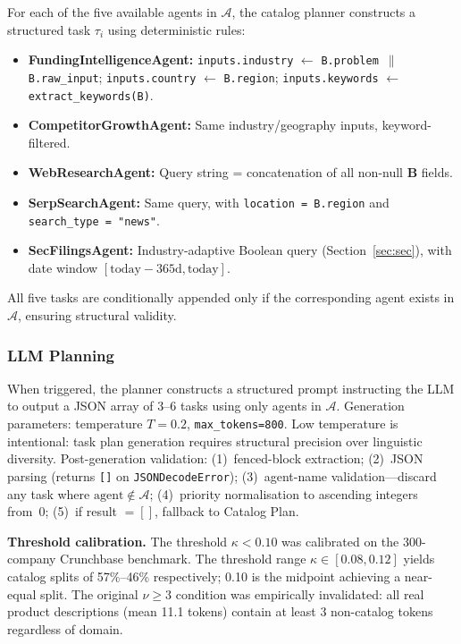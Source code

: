 \documentclass[preprint,12pt]{elsarticle}
\newcommand{\B}{\mathbf{B}}
\newcommand{\calA}{\mathcal{A}}
\begin{document}
For each of the five available agents in $\calA$, the catalog planner constructs
a structured task $\tau_i$ using deterministic rules:
\begin{itemize}
  \item \textbf{FundingIntelligenceAgent:} \texttt{inputs.industry}
        $\leftarrow$ \texttt{B.problem $\|$ B.raw\_input};
        \texttt{inputs.country} $\leftarrow$ \texttt{B.region};
        \texttt{inputs.keywords} $\leftarrow$ \texttt{extract\_keywords(B)}.
  \item \textbf{CompetitorGrowthAgent:} Same industry/geography inputs,
        keyword-filtered.
  \item \textbf{WebResearchAgent:} Query string = concatenation of all non-null
        $\B$ fields.
  \item \textbf{SerpSearchAgent:} Same query, with \texttt{location = B.region}
        and \texttt{search\_type = "news"}.
  \item \textbf{SecFilingsAgent:} Industry-adaptive Boolean query
        (Section~\ref{sec:sec}), with date window $[\text{today} - 365\text{d},
        \text{today}]$.
\end{itemize}
All five tasks are conditionally appended only if the corresponding agent exists
in $\calA$, ensuring structural validity.

\subsubsection{LLM Planning}

When triggered, the planner constructs a structured prompt instructing the LLM to
output a JSON array of 3--6 tasks using only agents in $\calA$.
Generation parameters: temperature $T{=}0.2$, \texttt{max\_tokens=800}. Low
temperature is intentional: task plan generation requires structural precision
over linguistic diversity. Post-generation validation: (1)~fenced-block
extraction; (2)~JSON parsing (returns \texttt{[]} on \texttt{JSONDecodeError});
(3)~agent-name validation---discard any task where
$\text{agent} \notin \calA$; (4)~priority normalisation to ascending integers
from~0; (5)~if result $= []$, fallback to Catalog Plan.

\textbf{Threshold calibration.} The threshold $\kappa < 0.10$ was calibrated on
the 300-company Crunchbase benchmark. The threshold range $\kappa \in [0.08,
0.12]$ yields catalog splits of 57\%--46\% respectively; 0.10 is the midpoint
achieving a near-equal split. The original $\nu \ge 3$ condition was empirically
invalidated: all real product descriptions (mean 11.1 tokens) contain at least 3
non-catalog tokens regardless of domain.
\end{document}
